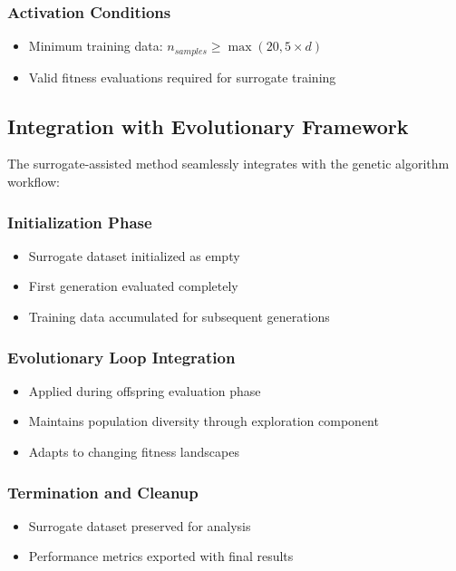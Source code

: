 \documentclass[12pt,a4paper]{article}
\begin{document}
\subsubsection{Activation Conditions}
\begin{itemize}
\item Minimum training data: $n_{samples} \geq \max(20, 5 \times d)$
\item Valid fitness evaluations required for surrogate training
\end{itemize}

\subsection{Integration with Evolutionary Framework}

The surrogate-assisted method seamlessly integrates with the genetic algorithm workflow:

\subsubsection{Initialization Phase}
\begin{itemize}
\item Surrogate dataset initialized as empty
\item First generation evaluated completely
\item Training data accumulated for subsequent generations
\end{itemize}

\subsubsection{Evolutionary Loop Integration}
\begin{itemize}
\item Applied during offspring evaluation phase
\item Maintains population diversity through exploration component
\item Adapts to changing fitness landscapes
\end{itemize}

\subsubsection{Termination and Cleanup}
\begin{itemize}
\item Surrogate dataset preserved for analysis
\item Performance metrics exported with final results
\end{itemize}
\end{document}
